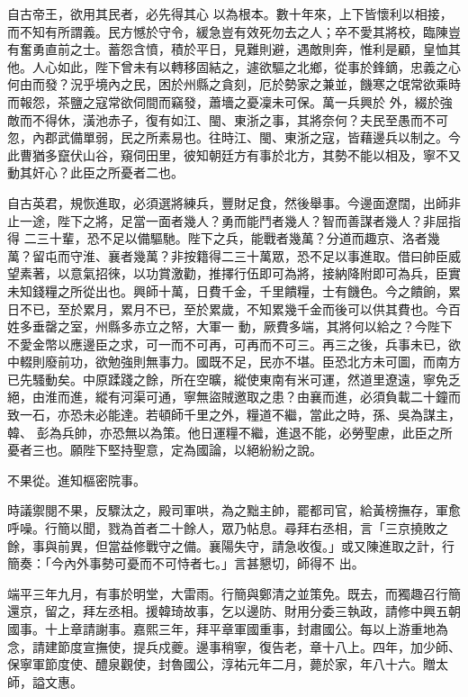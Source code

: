 \begin{pinyinscope}
 自古帝王，欲用其民者，必先得其心
 以為根本。數十年來，上下皆懷利以相接，而不知有所謂義。民方憾於守令，緩急豈有效死勿去之人；卒不愛其將校，臨陳豈有奮勇直前之士。蓄怨含憤，積於平日，見難則避，遇敵則奔，惟利是顧，皇恤其他。人心如此，陛下曾未有以轉移固結之，遽欲驅之北鄉，從事於鋒鏑，忠義之心何由而發？況乎境內之民，困於州縣之貪刻，厄於勢家之兼並，饑寒之氓常欲乘時而報怨，茶鹽之寇常欲伺間而竊發，蕭墻之憂凜未可保。萬一兵興於
 外，綴於強敵而不得休，潢池赤子，復有如江、閩、東浙之事，其將奈何？夫民至愚而不可忽，內郡武備單弱，民之所素易也。往時江、閩、東浙之寇，皆藉邊兵以制之。今此曹猶多竄伏山谷，窺伺田里，彼知朝廷方有事於北方，其勢不能以相及，寧不又動其奸心？此臣之所憂者二也。



 自古英君，規恢進取，必須選將練兵，豐財足食，然後舉事。今邊面遼闊，出師非止一途，陛下之將，足當一面者幾人？勇而能鬥者幾人？智而善謀者幾人？非屈指得
 二三十輩，恐不足以備驅馳。陛下之兵，能戰者幾萬？分道而趣京、洛者幾萬？留屯而守淮、襄者幾萬？非按籍得二三十萬眾，恐不足以事進取。借曰帥臣威望素著，以意氣招徠，以功賞激勸，推擇行伍即可為將，接納降附即可為兵，臣實未知錢糧之所從出也。興師十萬，日費千金，千里饋糧，士有饑色。今之饋餉，累日不已，至於累月，累月不已，至於累歲，不知累幾千金而後可以供其費也。今百姓多垂罄之室，州縣多赤立之帑，大軍一
 動，厥費多端，其將何以給之？今陛下不愛金幣以應邊臣之求，可一而不可再，可再而不可三。再三之後，兵事未已，欲中輟則廢前功，欲勉強則無事力。國既不足，民亦不堪。臣恐北方未可圖，而南方已先騷動矣。中原蹂踐之餘，所在空曠，縱使東南有米可運，然道里遼遠，寧免乏絕，由淮而進，縱有河渠可通，寧無盜賊邀取之患？由襄而進，必須負載二十鐘而致一石，亦恐未必能達。若頓師千里之外，糧道不繼，當此之時，孫、吳為謀主，韓、
 彭為兵帥，亦恐無以為策。他日運糧不繼，進退不能，必勞聖慮，此臣之所憂者三也。願陛下堅持聖意，定為國論，以絕紛紛之說。



 不果從。進知樞密院事。



 時議禦閱不果，反驟汰之，殿司軍哄，為之黜主帥，罷都司官，給黃榜撫存，軍愈呼噪。行簡以聞，戮為首者二十餘人，眾乃帖息。尋拜右丞相，言「三京撓敗之餘，事與前異，但當益修戰守之備。襄陽失守，請急收復。」或又陳進取之計，行簡奏：「今內外事勢可憂而不可恃者七。」言甚懇切，師得不
 出。



 端平三年九月，有事於明堂，大雷雨。行簡與鄭清之並策免。既去，而獨趣召行簡還京，留之，拜左丞相。援韓琦故事，乞以邊防、財用分委三執政，請修中興五朝國事。十上章請謝事。嘉熙三年，拜平章軍國重事，封肅國公。每以上游重地為念，請建節度宣撫使，提兵戍夔。邊事稍寧，復告老，章十八上。四年，加少師、保寧軍節度使、醴泉觀使，封魯國公，淳祐元年二月，薨於家，年八十六。贈太師，謚文惠。




\end{pinyinscope}
